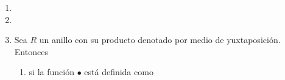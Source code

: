 \documentclass{article}
\newcommand{\lrprth}[1]{
    \left(#1\right)
}
\theoremstyle{definition}
\theoremstyle{plain}
\theoremstyle{plain}
\theoremstyle{definition}
\theoremstyle{definition}
\theoremstyle{definition}
\theoremstyle{definition}
\theoremstyle{definition}
\theoremstyle{definition}
\begin{document}
\begin{enumerate}
\begin{proof}
    con $\lambda_\bullet$ definido como en (b).\\
    Por los (a) y (b) las aplicaciones $f$ y $g$ son funciones bien definidas.\\
    Sea $\lrprth{{}_RM,\bullet}\in {}_RMod$. Entonces
    \begin{align*}
        f\circ g\lrprth{\lrprth{{}_RM,\bullet}}&=f\lrprth{g\lrprth{\lrprth{{}_RM,\bullet}}}\\
        &=f\lrprth{\lrprth{\lambda_\bullet,M}}\\
        &=\lrprth{{}_RM,\bullet_{\lambda_\bullet}}.
        \intertext{Sean $r\in R$ y $m\in M$. Así}
        r\bullet_{\lambda_\bullet}m&=\lambda_\bullet(r)\lrprth{m}\\
        &=r\bullet m\\
        &\implies \bullet=\bullet_{\lambda_\bullet}.\\
        &\implies f\circ g\lrprth{\lrprth{{}_RM,\bullet}}=\lrprth{{}_RM,\bullet}\\
        \implies f\circ g&=Id_{{}_RMod}.
        \intertext{Ahora, sea $\lrprth{\lambda,M}\in {}_RRep$. Luego}
         g\circ f\lrprth{\lrprth{\lambda,M}}&=g\lrprth{f\lrprth{\lrprth{\lambda,M}}}\\
         &=g\lrprth{\lrprth{{}_RM,\bullet_\lambda}}\\
         &=\lrprth{\lambda_{\bullet_\lambda},M}.
         \intertext{Sea $r\in R$ y $m\in M$. Se tiene que}
         \lambda_{\bullet_\lambda}(r)\lrprth{m}&=r\bullet_\lambda m\\
         &=\lambda(r)\lrprth{m}\\
         &\implies \lambda_{\bullet_\lambda}(r)=\lambda(r)\\
         &\implies \lambda_{\bullet_\lambda}=\lambda\\
         &\implies g\circ f\lrprth{\lrprth{\lambda,M}}=\lrprth{\lambda, M}\\
         \implies g\circ f &=Id_{{}_RRep}.
    \end{align*}
    De modo que $f$ es invertible, con inversa $g$, y por lo tanto es una biyección, con lo cual se tiene lo deseado.
    \end{proof}
    \item 
    \item 
    \item Sea $R$ un anillo con su producto denotado por medio de yuxtaposición. Entonces
    \begin{enumerate}[label=(\alph*)]
        \item si la función $\bullet$ está definida como

\end{enumerate}
\end{enumerate}
\end{document}
